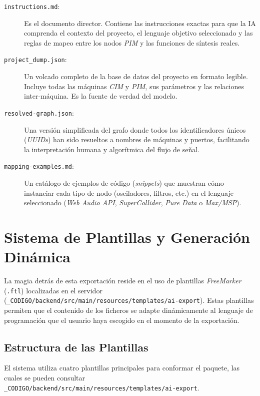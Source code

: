 \begin{description}
    \item[\texttt{instructions.md}:] Es el documento director. Contiene las instrucciones exactas para que la IA comprenda el contexto del proyecto, el lenguaje objetivo seleccionado y las reglas de mapeo entre los nodos \textit{PIM} y las funciones de síntesis reales.
    \item[\texttt{project\_dump.json}:] Un volcado completo de la base de datos del proyecto en formato legible. Incluye todas las máquinas \textit{CIM} y \textit{PIM}, sus parámetros y las relaciones inter-máquina. Es la fuente de verdad del modelo.
    \item[\texttt{resolved-graph.json}:] Una versión simplificada del grafo donde todos los identificadores únicos (\textit{UUIDs}) han sido resueltos a nombres de máquinas y puertos, facilitando la interpretación humana y algorítmica del flujo de señal.
    \item[\texttt{mapping-examples.md}:] Un catálogo de ejemplos de código (\textit{snippets}) que muestran cómo instanciar cada tipo de nodo (osciladores, filtros, etc.) en el lenguaje seleccionado (\textit{Web Audio API}, \textit{SuperCollider}, \textit{Pure Data} o \textit{Max/MSP}).
\end{description}

\section{Sistema de Plantillas y Generación Dinámica}

La magia detrás de esta exportación reside en el uso de plantillas \textit{FreeMarker} (\texttt{.ftl}) localizadas en el servidor (\texttt{\_CODIGO/backend/src/main/resources/templates/ai-export}). Estas plantillas permiten que el contenido de los ficheros se adapte dinámicamente al lenguaje de programación que el usuario haya escogido en el momento de la exportación.

\subsection{Estructura de las Plantillas}

El sistema utiliza cuatro plantillas principales para conformar el paquete, las cuales se pueden consultar  
\texttt{\_CODIGO/backend/src/main/resources/templates/ai-export}.

